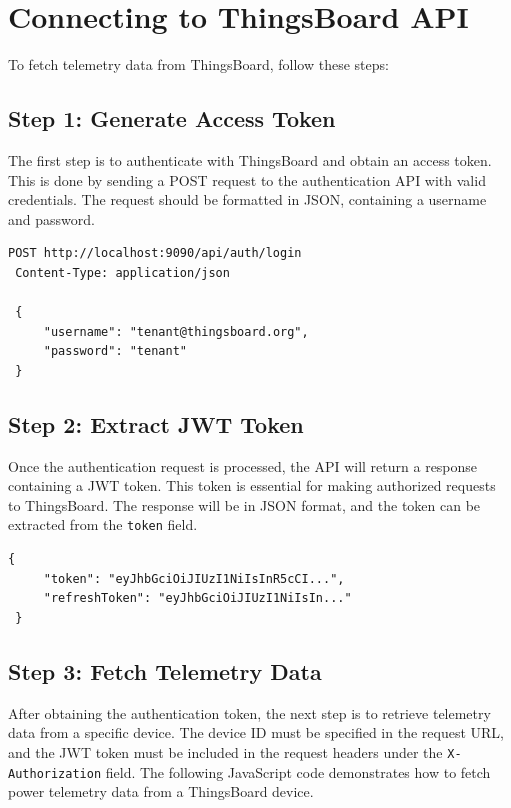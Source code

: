 \documentclass[a4paper,12pt]{report}
\begin{document}
 \section{Connecting to ThingsBoard API}
 
 To fetch telemetry data from ThingsBoard, follow these steps:
 
 \subsection{Step 1: Generate Access Token}
 The first step is to authenticate with ThingsBoard and obtain an access token. This is done by sending a POST request to the authentication API with valid credentials. The request should be formatted in JSON, containing a username and password.
 
 \begin{lstlisting}[caption={Content for Body of POST Request}]
 POST http://localhost:9090/api/auth/login
 Content-Type: application/json
 
 {
     "username": "tenant@thingsboard.org",
     "password": "tenant"
 }
 \end{lstlisting}
 
 \subsection{Step 2: Extract JWT Token}
 Once the authentication request is processed, the API will return a response containing a JWT token. This token is essential for making authorized requests to ThingsBoard. The response will be in JSON format, and the token can be extracted from the \texttt{token} field.
 
 \begin{lstlisting}[caption={Response of POST Request}]
 {
     "token": "eyJhbGciOiJIUzI1NiIsInR5cCI...",
     "refreshToken": "eyJhbGciOiJIUzI1NiIsIn..."
 }
 \end{lstlisting}
 
 \subsection{Step 3: Fetch Telemetry Data}
 After obtaining the authentication token, the next step is to retrieve telemetry data from a specific device. The device ID must be specified in the request URL, and the JWT token must be included in the request headers under the \texttt{X-Authorization} field. The following JavaScript code demonstrates how to fetch power telemetry data from a ThingsBoard device.
 
\end{document}
